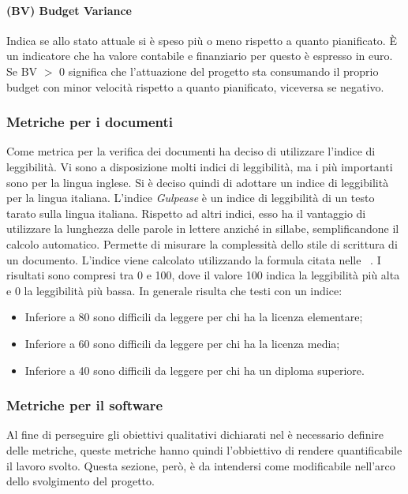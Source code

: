 \paragraph{(BV) Budget Variance}
Indica se allo stato attuale si è speso più o meno rispetto a quanto pianificato.
È un indicatore che ha valore contabile e finanziario per questo è espresso in euro.
Se BV $>$ 0 significa che l’attuazione del progetto sta consumando il proprio budget con minor velocità rispetto a quanto pianificato, viceversa se negativo.

\subsubsection{Metriche per i documenti}
Come metrica per la verifica dei documenti \gruppo ha deciso di utilizzare l’indice di leggibilità.
Vi sono a disposizione molti indici di leggibilità, ma i più importanti sono per la lingua inglese. Si è deciso quindi di adottare un indice di leggibilità per la lingua italiana.
L’indice \textit{Gulpease} è un indice di leggibilità di un testo tarato sulla lingua italiana. Rispetto ad altri indici, esso ha il vantaggio di utilizzare la lunghezza delle parole in lettere anziché in sillabe, semplificandone il calcolo automatico. Permette di misurare la complessità dello stile di scrittura di un documento.
L’indice viene calcolato utilizzando la formula citata nelle \infoNDP~.
I risultati sono compresi tra 0 e 100, dove il valore 100 indica la leggibilità più alta e 0 la leggibilità più bassa. In generale risulta che testi con un indice:
\begin{itemize}
\item Inferiore a 80 sono difficili da leggere per chi ha la licenza elementare;
\item Inferiore a 60 sono difficili da leggere per chi ha la licenza media;
\item Inferiore a 40 sono difficili da leggere per chi ha un diploma superiore.
\end{itemize}

\subsubsection{Metriche per il software}
Al fine di perseguire gli obiettivi qualitativi dichiarati nel \PianoDiQualifica{} è necessario definire delle metriche, queste metriche hanno quindi l'obbiettivo di rendere quantificabile il lavoro svolto. Questa sezione, però, è da intendersi come modificabile nell'arco dello svolgimento del progetto.
